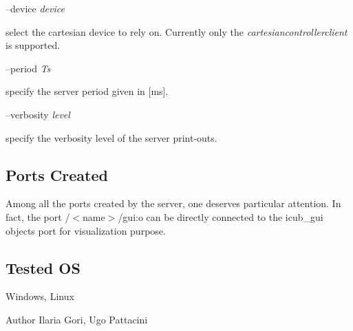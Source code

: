 --device {\itshape device} 
\begin{DoxyItemize}
\item select the cartesian device to rely on. Currently only the {\itshape cartesiancontrollerclient} is supported.
\end{DoxyItemize}

--period {\itshape Ts} 
\begin{DoxyItemize}
\item specify the server period given in \mbox{[}ms\mbox{]}.
\end{DoxyItemize}

--verbosity {\itshape level} 
\begin{DoxyItemize}
\item specify the verbosity level of the server print-\/outs.
\end{DoxyItemize}\hypertarget{group__d4cServer_portsc_sec}{}\subsection{Ports Created}\label{group__d4cServer_portsc_sec}
Among all the ports created by the server, one deserves particular attention. In fact, the port /$<$name$>$/gui\+:o can be directly connected to the icub\+\_\+gui objects port for visualization purpose.\hypertarget{group__d4cServer_tested_os_sec}{}\subsection{Tested O\+S}\label{group__d4cServer_tested_os_sec}
Windows, Linux

\begin{DoxyAuthor}{Author}
Ilaria Gori, Ugo Pattacini 
\end{DoxyAuthor}
